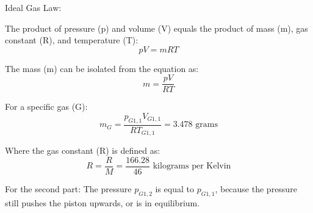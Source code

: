 Ideal Gas Law:

The product of pressure (p) and volume (V) equals the product of mass (m), gas constant (R), and temperature (T):
\[ pV = mRT \]

The mass (m) can be isolated from the equation as:
\[ m = \frac{pV}{RT} \]

For a specific gas (G):
\[ m_{G} = \frac{p_{G1,1} V_{G1,1}}{R T_{G1,1}} = 3.478 \text{ grams} \]

Where the gas constant (R) is defined as:
\[ R = \frac{R}{M} = \frac{166.28}{46} \text{ kilograms per Kelvin} \]

For the second part:
The pressure \( p_{G1,2} \) is equal to \( p_{G1,1} \), because the pressure still pushes the piston upwards, or is in equilibrium.